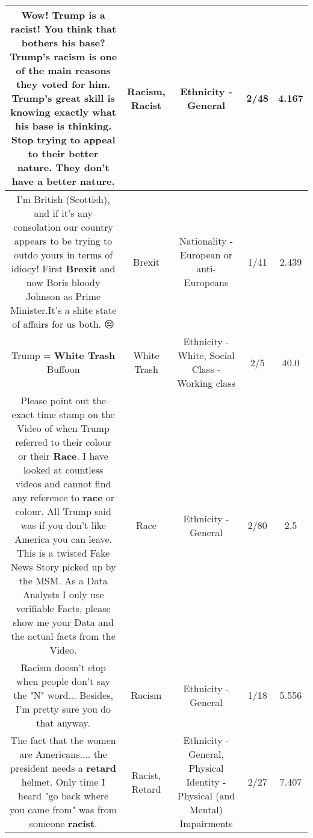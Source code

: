 \documentclass[11pt]{article}
\newlength\mylength
\begin{document}
\begin{center}
\begin{longtable}{|C{.65\mylength}|C{.30\mylength}|C{.12\mylength}|C{.12\mylength}|C{.12\mylength}|}
  \small Wow! Trump is a \textbf{racist}! You think that bothers his base? Trump's \textbf{racism} is one of the main reasons they voted for him. Trump's great skill is knowing exactly what his base is thinking. Stop trying to appeal to their better nature. They don't have a better nature.\normalsize   & Racism, Racist & Ethnicity - General & 2/48 & 4.167 \\  \hline
  \small I'm British (Scottish), and if it's any consolation our country appears to be trying to outdo yours in terms of idiocy! First \textbf{Brexit} and now Boris bloody Johnson as Prime Minister.It's a shite state of affairs for us both. 😔\normalsize   & Brexit & Nationality - European or anti-Europeans & 1/41 & 2.439 \\  \hline
  \small Trump = \textbf{W\textbf{hite Trash}} Buffoon\normalsize   & White Trash & Ethnicity - White, Social Class - Working class & 2/5 & 40.0 \\  \hline
  \small Please point out the exact time stamp on the Video of when Trump referred to their colour or their \textbf{Race}. I have looked at countless videos and cannot find any reference to \textbf{race} or colour. All Trump said was if you don't like America you can leave. This is a twisted Fake News Story picked up by the MSM. As a Data Analysts I only use verifiable Facts, please show me your Data and the actual facts from the Video.\normalsize   & Race & Ethnicity - General & 2/80 & 2.5 \\  \hline
  \small Racism doesn't stop when people don't say the "N" word... Besides, I'm pretty sure you do that anyway.\normalsize   & Racism & Ethnicity - General & 1/18 & 5.556 \\  \hline
  \small The fact that the women are Americans.... the president needs a \textbf{retard} helmet. Only time I heard  "go back where you came from" was from someone \textbf{racist}.\normalsize   & Racist, Retard & Ethnicity - General, Physical Identity - Physical (and Mental) Impairments & 2/27 & 7.407 \\  \hline

\end{longtable}
\end{center}
\end{document}

